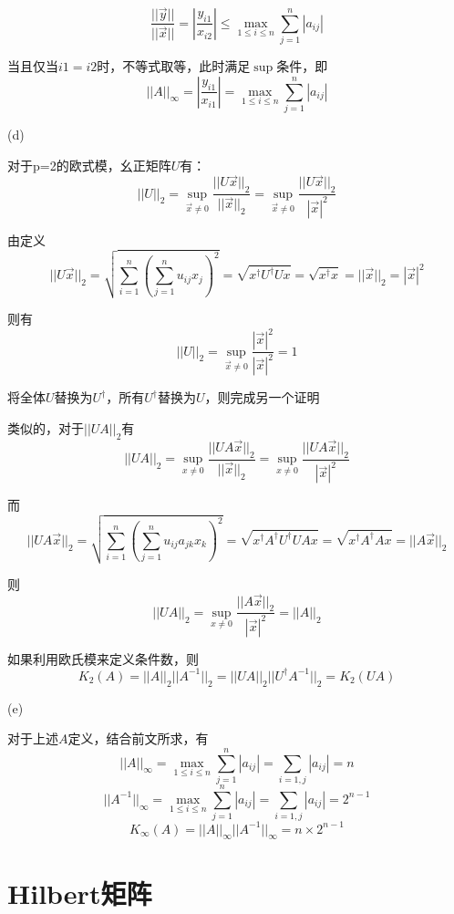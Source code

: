 \documentclass{article}
\begin{document}
$$\frac{||\vec y||}{||\vec x||}=|\frac{y_{i1}}{x_{i2}}|\leq \max_{1\leq i\leq n}\sum_{j=1}^n|a_{ij}|$$
\par
当且仅当$i1=i2$时，不等式取等，此时满足$\sup$条件，即
$$||A||_\infty=|\frac{y_{i1}}{x_{i1}}|=\max_{1\leq i\leq n}\sum_{j=1}^n|a_{ij}|$$
\par
(d)\par
对于p=2的欧式模，幺正矩阵$U$有：
$$||U||_2=\sup_{\vec x\neq 0}\frac{||U\vec x||_2}{||\vec x||_2}=\sup_{\vec x\neq 0}\frac{||U\vec x||_2}{|\vec x|^2}$$
\par
由定义
$$||U\vec x||_2=\sqrt{\sum_{i=1}^n\left(\sum_{j=1}^n u_{ij}x_j\right)^2}=\sqrt{x^\dag U^\dag Ux}=\sqrt{x^\dag x}=||\vec x||_2=|\vec x|^2$$
\par
则有
$$||U||_2=\sup_{\vec x\neq 0}\frac{|\vec x|^2}{|\vec x|^2}=1$$
\par
将全体$U$替换为$U^\dag$，所有$U^\dag$替换为$U$，则完成另一个证明\par
类似的，对于$||UA||_2$有
$$||UA||_2=\sup_{x\neq 0}\frac{||UA\vec x||_2}{||\vec x||_2}=\sup_{x\neq 0}\frac{||UA\vec x||_2}{|\vec x|^2}$$
\par
而
$$||UA\vec x||_2=\sqrt{\sum_{i=1}^n\left(\sum_{j=1}^n u_{ij}a_{jk}x_k\right)^2}=\sqrt{x^\dag A^\dag U^\dag UAx}=\sqrt{x^\dag A^\dag A x}=||A\vec x||_2$$
\par
则
$$||UA||_2=\sup_{x\neq 0}\frac{||A\vec x||_2}{|\vec x|^2}=||A||_2$$
\par
如果利用欧氏模来定义条件数，则
$$K_2(A)=||A||_2||A^{-1}||_2=||UA||_2||U^\dag A^{-1}||_2=K_2(UA)$$
\par
(e)\par
对于上述$A$定义，结合前文所求，有
$$||A||_\infty=\max_{1\leq i\leq n}\sum_{j=1}^n|a_{ij}|=\sum_{i=1,j}|a_{ij}|=n$$
$$||A^{-1}||_\infty=\max_{1\leq i\leq n}\sum_{j=1}^n|a_{ij}|=\sum_{i=1,j}|a_{ij}|=2^{n-1}$$
$$K_\infty(A)=||A||_\infty||A^{-1}||_\infty=n\times 2^{n-1}$$

\section{Hilbert矩阵}
\end{document}
